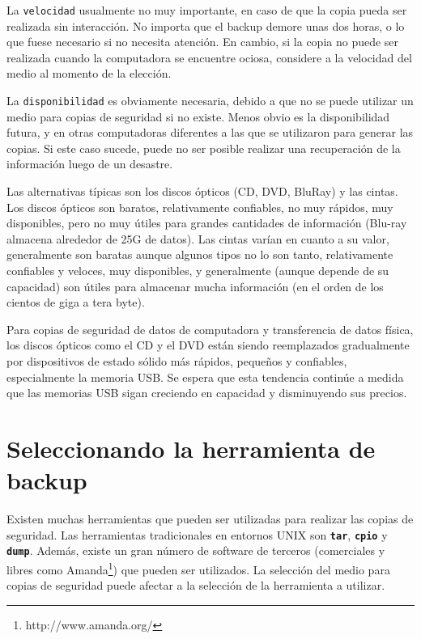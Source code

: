 \documentclass[12pt]{article}
\begin{document}
La \texttt{velocidad} usualmente no muy importante, en caso de que la 
copia pueda ser
realizada sin interacción. No importa que el backup demore unas 
dos horas, o lo que fuese necesario si no necesita atención. En cambio, si 
la copia no puede ser realizada cuando la computadora se encuentre ociosa, 
considere a la velocidad del medio al momento de la elección.

La \texttt{disponibilidad} es obviamente necesaria, debido a que no se 
puede utilizar
un medio para copias de seguridad si no existe. Menos obvio es la 
disponibilidad futura, y en otras computadoras diferentes a las que se 
utilizaron para generar las copias.
Si este caso sucede, puede no ser posible realizar una recuperación de la 
información luego de un desastre.

Las alternativas típicas son los discos ópticos (CD, DVD, BluRay) y las
cintas. Los discos ópticos son baratos, relativamente confiables, no muy 
rápidos, muy disponibles, pero no muy útiles para grandes cantidades de 
información (Blu-ray almacena alrededor de 25G de datos). Las 
cintas varían en cuanto a su valor, generalmente son baratas aunque algunos
tipos no lo son tanto, relativamente confiables y veloces, muy disponibles, 
y generalmente (aunque depende de su capacidad) son útiles para almacenar 
mucha información (en el orden de los cientos de giga a tera byte). 

Para copias de seguridad de datos de computadora y transferencia de datos 
física, los discos ópticos como el CD y el DVD están siendo reemplazados 
gradualmente por dispositivos de estado sólido más rápidos, pequeños y 
confiables, especialmente la memoria USB. Se espera que esta tendencia 
continúe a medida que las memorias USB sigan creciendo en capacidad y 
disminuyendo sus precios. 
	
\section*{Seleccionando la herramienta de backup}

Existen muchas herramientas que pueden ser utilizadas para realizar las 
copias de seguridad.  Las herramientas tradicionales en entornos UNIX 
son \texttt{\textbf{tar}}, \texttt{\textbf{cpio}} y \texttt{\textbf{dump}}.
 Además, existe un gran 
número de software de terceros (comerciales y libres como
 Amanda\footnote{http://www.amanda.org/}) que pueden ser 
utilizados. La selección del medio para copias de seguridad puede afectar 
a la selección de la herramienta a utilizar.
\end{document}
